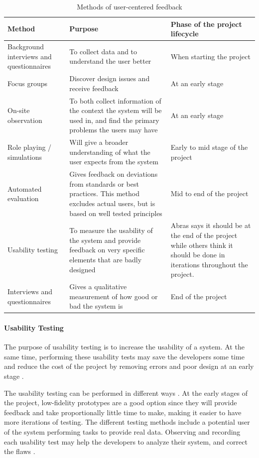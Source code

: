 \begin{table}[H]
\begin{tabular}{|p{5cm} | p{5cm} | p{5cm} |}
\hline
\textbf{Method} & \textbf{Purpose} & \textbf{Phase of the project lifecycle} \\ \hline
Background interviews and questionnaires & To collect data and to understand the user better & When starting the project \\ \hline
Focus groups & Discover design issues and receive feedback & At an early stage \\ \hline
On-site observation & To both collect information of the context the system will be used in, and find the primary problems the users may have & At an early stage \\ \hline
Role playing / simulations & Will give a broader understanding of what the user expects from the system & Early to mid stage of the project \\ \hline
Automated evaluation & Gives feedback on deviations from standards or best practices. This method excludes actual users, but is based on well tested principles & Mid to end of the project \\ \hline
Usability testing & To measure the usability of the system and provide feedback on very specific elements that are badly designed & Abras \cite{abrasusercentereddesign} says it should be at the end of the project while others \cite{schneidermanusercentered} think it should be done in iterations throughout the project. \\ \hline
Interviews and questionnaires & Gives a qualitative measurement of how good or bad the system is & End of the project \\ \hline
\end{tabular}
\caption{Methods of user-centered feedback}
\label{table:designduringlifecycle}
\end{table}


\paragraph{Usability Testing}
The purpose of usability testing is to increase the usability of a system. At the same time, performing these usability tests may save the developers some time and reduce the cost of the project by removing errors and poor design at an early stage \cite{dumas1995practical}.

The usability testing can be performed in different ways \cite{schneidermanusercentered}. At the early stages of the project, low-fidelity prototypes are a good option since they will provide feedback and take proportionally little time to make, making it easier to have more iterations of testing. The different testing methods include a potential user of the system performing tasks to provide real data. Observing and recording each usability test may help the developers to analyze their system, and correct the flaws \cite{dumas1995practical}. 

